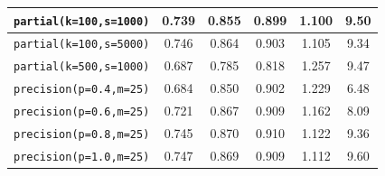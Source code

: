 \begin{table}[]
{\begin{tabular}{|c|c|c|c|c|c|}
\texttt{partial(k=100,s=1000)} & 0.739 & 0.855 & 0.899 & 1.100 & 9.50 \\ \hline
\texttt{partial(k=100,s=5000)} & 0.746 & 0.864 & 0.903 & 1.105 & 9.34 \\ \hline
\texttt{partial(k=500,s=1000)} & 0.687 & 0.785 & 0.818 & 1.257 & 9.47 \\ \hline
\hline
\texttt{precision(p=0.4,m=25)} & 0.684 & 0.850 & 0.902 & 1.229 & 6.48 \\ \hline
\texttt{precision(p=0.6,m=25)} & 0.721 & 0.867 & 0.909 & 1.162 & 8.09 \\ \hline
\texttt{precision(p=0.8,m=25)} & 0.745 & 0.870 & 0.910 & 1.122 & 9.36 \\ \hline
\texttt{precision(p=1.0,m=25)} & 0.747 & 0.869 & 0.909 & 1.112 & 9.60 \\ \hline
\end{tabular}
}
\end{table}

\begin{table}[]
\centering
\caption{Summary of results for recency weighting $-$ \texttt{athome1}}
\label{table.recency_athome1}
\end{table}

